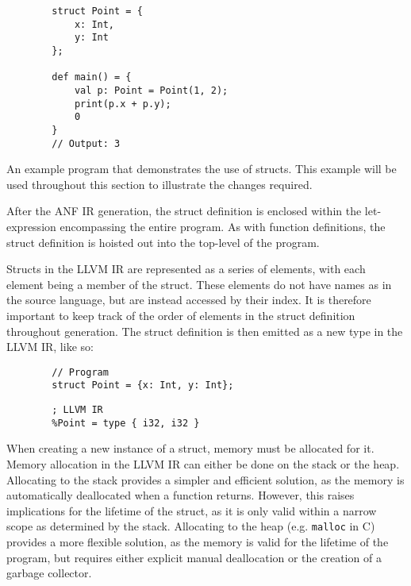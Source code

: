 \begin{tcolorbox}
    \begin{verbatim}
        struct Point = {
            x: Int,
            y: Int
        };

        def main() = {
            val p: Point = Point(1, 2);
            print(p.x + p.y);
            0
        }
        // Output: 3
    \end{verbatim}
    \tcblower
    \footnotesize
    An example program that demonstrates the use of structs.
    This example will be used throughout this section to illustrate the changes required.
\end{tcolorbox}

After the ANF IR generation, the struct definition is enclosed within the let-expression
encompassing the entire program. As with function definitions, the struct definition is hoisted out
into the top-level of the program.

Structs in the LLVM IR are represented as a series of elements, with each element being a member of
the struct. These elements do not have names as in the source language, but are instead accessed by
their index. It is therefore important to keep track of the order of elements in the struct
definition throughout generation. The struct definition is then emitted as a new type in the LLVM
IR\@, like so:

\begin{tcolorbox}[sidebyside]
    \begin{verbatim}
        // Program
        struct Point = {x: Int, y: Int};
    \end{verbatim}
    \tcblower
    \begin{verbatim}
        ; LLVM IR
        %Point = type { i32, i32 }
    \end{verbatim}
\end{tcolorbox}

When creating a new instance of a struct, memory must be allocated for it. Memory allocation in the
LLVM IR can either be done on the stack or the heap. Allocating to the stack provides a simpler and
efficient solution, as the memory is automatically deallocated when a function returns. However,
this raises implications for the lifetime of the struct, as it is only valid within a narrow scope
as determined by the stack. Allocating to the heap (e.g. \texttt{malloc} in C) provides a more
flexible solution, as the memory is valid for the lifetime of the program, but requires either
explicit manual deallocation or the creation of a garbage collector.

